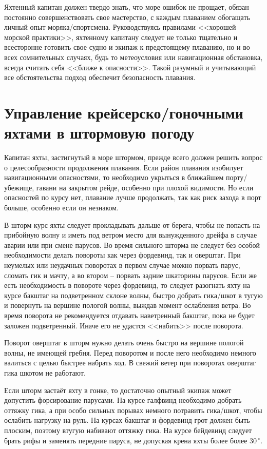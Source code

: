 \documentclass[a4paper, 12pt, twoside, final, book, russian, fittopage, cyremdash]{ncc}
\newcommand{\gr}{\ensuremath{\,^\circ}\xspace}
\begin{document}
Яхтенный капитан должен твердо знать, что море ошибок не прощает, обязан постоянно совершенствовать свое мастерство, с каждым плаванием обогащать личный опыт моряка\-/спортсмена. Руководствуясь правилами <<хорошей морской практики>>, яхтенному капитану следует не только тщательно и всесторонне готовить свое судно и экипаж к предстоящему плаванию, но и во всех сомнительных случаях, будь то метеоусловия или навигационная обстановка, всегда считать себя <<ближе к опасности>>. Такой разумный и учитывающий все обстоятельства подход обеспечит безопасность плавания.

\section{Управление крейсерско\-/гоночными яхтами в штормовую погоду}

Капитан яхты, застигнутый в море штормом, прежде всего должен решить вопрос о целесообразности продолжения плавания. Если район плавания изобилует навигационными опасностями, то необходимо укрыться в ближайшем порту\-/убежище, гавани на закрытом рейде, особенно при плохой видимости. Но если опасностей по курсу нет, плавание лучше продолжать, так как риск захода в порт больше, особенно если он незнаком.

В шторм курс яхты следует прокладывать дальше от берега, чтобы не попасть на прибойную волну и иметь под ветром место для вынужденного дрейфа в случае аварии или при смене парусов. Во время сильного шторма не следует без особой необходимости делать повороты как через фордевинд, так и оверштаг. При неумелых или неудачных поворотах в первом случае можно порвать парус, сломать гик и мачту, а во втором \--- порвать задние шкаторины парусов. Если же есть необходимость в повороте через фордевинд, то следует разогнать яхту на курсе бакштаг на подветренном склоне волны, быстро добрать гика\-/шкот в тугую и повернуть на вершине пологой волны, выждав момент ослабления ветра. Во время поворота не рекомендуется отдавать наветренный бакштаг, пока не будет заложен подветренный. Иначе его не удастся <<набить>> после поворота.

Поворот оверштаг в шторм нужно делать очень быстро на вершине пологой волны, не имеющей гребня. Перед поворотом и после него необходимо немного валиться с целью быстрее набрать ход. В свежий ветер при поворотах оверштаг гика шкотом не работают.

Если шторм застаёт яхту в гонке, то достаточно опытный экипаж может допустить форсирование парусами. На курсе галфвинд необходимо добрать оттяжку гика, а при особо сильных порывах немного потравить гика\-/шкот, чтобы ослабить нагрузку на руль. На курсах бакштаг и фордевинд грот должен быть плоским, поэтому втугую набивают оттяжку гика. На курсе бейдевинд следует брать рифы и заменять передние паруса, не допуская крена яхты более более 30\gr.
 
\end{document}
